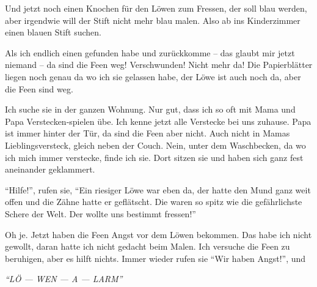 Und jetzt noch einen Knochen für den Löwen zum Fressen, der soll blau werden, aber irgendwie will der Stift nicht mehr blau malen. Also ab ins Kinderzimmer einen blauen Stift suchen.

Als ich endlich einen gefunden habe und zurückkomme -- das glaubt mir jetzt niemand -- da sind die Feen weg! Verschwunden! Nicht mehr da! Die Papierblätter liegen noch genau da wo ich sie gelassen habe, der Löwe ist auch noch da, aber die Feen sind weg.

Ich suche sie in der ganzen Wohnung. Nur gut, dass ich so oft mit Mama und Papa Verstecken-spielen übe. Ich kenne jetzt alle Verstecke bei uns zuhause. Papa ist immer hinter der Tür, da sind die Feen aber nicht. Auch nicht in Mamas Lieblingsversteck, gleich neben der Couch. Nein, unter dem Waschbecken, da wo ich mich immer verstecke, finde ich sie. Dort sitzen sie und haben sich ganz fest aneinander geklammert.

\enquote{Hilfe!}, rufen sie, \enquote{Ein riesiger Löwe war eben da, der hatte den Mund ganz weit offen und die Zähne hatte er geflätscht. Die waren so spitz wie die gefährlichste Schere der Welt. Der wollte uns bestimmt fressen!}




Oh je. Jetzt haben die Feen Angst vor dem Löwen bekommen. Das habe ich nicht gewollt, daran hatte ich nicht gedacht beim Malen.  Ich versuche die Feen zu beruhigen, aber es hilft nichts. Immer wieder rufen sie \enquote{Wir haben Angst!}, und
\begin{center}
 {\color{DeepPink}
\large
\itshape
\enquote{LÖ --- WEN --- A --- LARM}}
\end{center}


